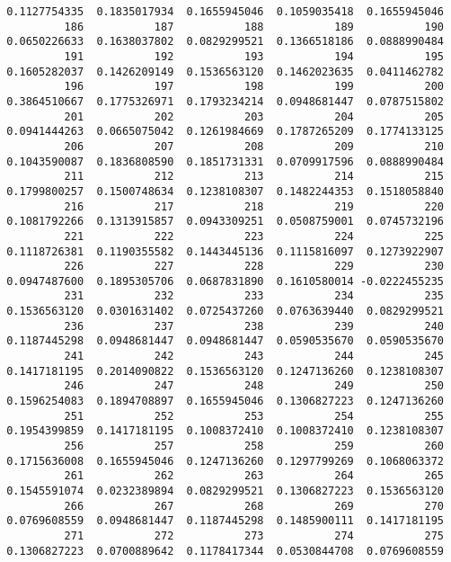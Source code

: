 \documentclass[
  letterpaper,
  DIV=11,
  numbers=noendperiod]{scrreprt}
\begin{document}
\begin{verbatim}
 0.1127754335  0.1835017934  0.1655945046  0.1059035418  0.1655945046 
          186           187           188           189           190 
 0.0650226633  0.1638037802  0.0829299521  0.1366518186  0.0888990484 
          191           192           193           194           195 
 0.1605282037  0.1426209149  0.1536563120  0.1462023635  0.0411462782 
          196           197           198           199           200 
 0.3864510667  0.1775326971  0.1793234214  0.0948681447  0.0787515802 
          201           202           203           204           205 
 0.0941444263  0.0665075042  0.1261984669  0.1787265209  0.1774133125 
          206           207           208           209           210 
 0.1043590087  0.1836808590  0.1851731331  0.0709917596  0.0888990484 
          211           212           213           214           215 
 0.1799800257  0.1500748634  0.1238108307  0.1482244353  0.1518058840 
          216           217           218           219           220 
 0.1081792266  0.1313915857  0.0943309251  0.0508759001  0.0745732196 
          221           222           223           224           225 
 0.1118726381  0.1190355582  0.1443445136  0.1115816097  0.1273922907 
          226           227           228           229           230 
 0.0947487600  0.1895305706  0.0687831890  0.1610580014 -0.0222455235 
          231           232           233           234           235 
 0.1536563120  0.0301631402  0.0725437260  0.0763639440  0.0829299521 
          236           237           238           239           240 
 0.1187445298  0.0948681447  0.0948681447  0.0590535670  0.0590535670 
          241           242           243           244           245 
 0.1417181195  0.2014090822  0.1536563120  0.1247136260  0.1238108307 
          246           247           248           249           250 
 0.1596254083  0.1894708897  0.1655945046  0.1306827223  0.1247136260 
          251           252           253           254           255 
 0.1954399859  0.1417181195  0.1008372410  0.1008372410  0.1238108307 
          256           257           258           259           260 
 0.1715636008  0.1655945046  0.1247136260  0.1297799269  0.1068063372 
          261           262           263           264           265 
 0.1545591074  0.0232389894  0.0829299521  0.1306827223  0.1536563120 
          266           267           268           269           270 
 0.0769608559  0.0948681447  0.1187445298  0.1485900111  0.1417181195 
          271           272           273           274           275 
 0.1306827223  0.0700889642  0.1178417344  0.0530844708  0.0769608559 

\end{verbatim}
\end{document}
